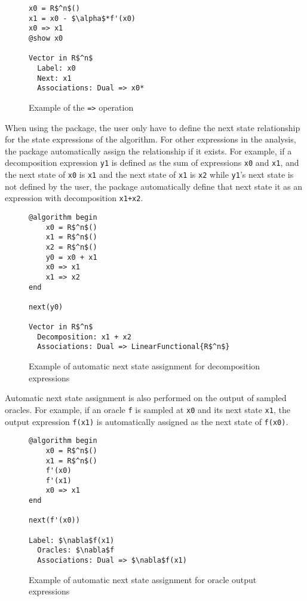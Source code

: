 \begin{figure}[h!]
	\begin{lstlisting}[mathescape]
x0 = R$^n$()
x1 = x0 - $\alpha$*f'(x0)
x0 => x1
@show x0

Vector in R$^n$
  Label: x0
  Next: x1
  Associations: Dual => x0*
	\end{lstlisting}
	\caption{Example of the \texttt{=>} operation}
	\label{ex_next!}
\end{figure}

When using the package, the user only have to define the next state relationship for the state expressions of the algorithm. For other expressions in the analysis, the package automatically assign the relationship if it exists. For example, if a decomposition expression \texttt{y1} is defined as the sum of expressions \texttt{x0} and \texttt{x1}, and the next state of \texttt{x0} is \texttt{x1} and the next state of \texttt{x1} is \texttt{x2} while \texttt{y1}'s next state is not defined by the user, the package automatically define that next state it as an expression with decomposition \texttt{x1+x2}.

\begin{figure}[h!]
	\begin{lstlisting}[mathescape]
@algorithm begin
	x0 = R$^n$()
	x1 = R$^n$()
	x2 = R$^n$()
	y0 = x0 + x1
	x0 => x1
	x1 => x2
end

next(y0)

Vector in R$^n$
  Decomposition: x1 + x2
  Associations: Dual => LinearFunctional{R$^n$}
\end{lstlisting}
\caption{Example of automatic next state assignment for decomposition expressions}
\label{ex_nextdecomp}
\end{figure}

Automatic next state assignment is also performed on the output of sampled oracles. For example, if an oracle \texttt{f} is sampled at \texttt{x0} and its next state \texttt{x1}, the output expression \texttt{f(x1)} is automatically assigned as the next state of \texttt{f(x0)}.


\begin{figure}[h!]
	\begin{lstlisting}[mathescape]
@algorithm begin
	x0 = R$^n$()
	x1 = R$^n$()
	f'(x0)
	f'(x1)
	x0 => x1
end

next(f'(x0))

Label: $\nabla$f(x1)
  Oracles: $\nabla$f
  Associations: Dual => $\nabla$f(x1)
\end{lstlisting}
\caption{Example of automatic next state assignment for oracle output expressions}
\label{ex_nextsample}
\end{figure}

